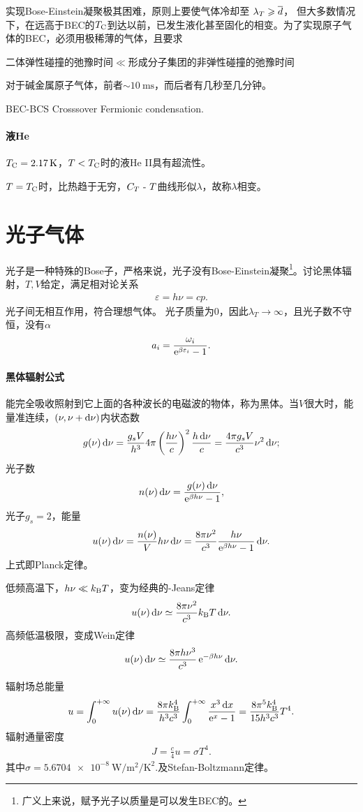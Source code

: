 实现Bose-Einstein凝聚极其困难，原则上要使气体冷却至
$\lambda_T\geqslant\overline{d}$，
但大多数情况下，在远高于BEC的$T_\mathrm C$到达以前，已发生液化甚至固化的相变。为了实现原子气体的BEC，必须用极稀薄的气体，且要求
\begin{center}
	二体弹性碰撞的弛豫时间$\ll$形成分子集团的非弹性碰撞的弛豫时间
\end{center}
对于碱金属原子气体，前者$\sim\SI{10}\ms$，而后者有几秒至几分钟。%

BEC-BCS Crosssover Fermionic condensation.
\paragraph{液He}$T_\crt=\SI{2.17}\K$，$T<T_\mathrm C$时的液He II具有超流性。

$T=T_\mathrm C$时，比热趋于无穷，$C_T~\text{-}~ T$曲线形似$\lambda$，故称$\lambda$相变。
\section{光子气体}
光子是一种特殊的Bose子，严格来说，光子没有Bose-Einstein凝聚\footnote{广义上来说，赋予光子以质量是可以发生BEC的。}。讨论黑体辐射，$T,V$给定，满足相对论关系
\begin{align}
	\varepsilon=h\nu=cp.
\end{align}
光子间无相互作用，符合理想气体。%
光子质量为0，因此$\lambda_T\to\infty$，且光子数不守恒，没有$\alpha$
\[
	a_i=\frac{\omega_i}{\mathop{}\!\mathrm{e}^{\beta\varepsilon_i}-1}.
\]
\paragraph{黑体辐射公式}能完全吸收照射到它上面的各种波长的电磁波的物体，称为黑体。当$V$很大时，能量准连续，$(\nu,\nu+\mathop{}\!\mathrm{d}\nu)$内状态数
\[
	g(\nu)\mathop{}\!\mathrm{d}\nu=\frac{g_sV}{h^3}4\pi\left(\frac{h\nu}c\right)^2\frac{h\mathop{}\!\mathrm{d}\nu}{c}=\frac{4\pi g_sV}{c^3}\nu^2\mathop{}\!\mathrm{d}\nu;
\]
光子数 
\[
	n(\nu)\mathop{}\!\mathrm{d}\nu=\frac{g(\nu)\mathop{}\!\mathrm{d}\nu}{\mathop{}\!\mathrm{e}^{\beta h\nu}-1},
\]
光子$g_s=2$，能量 
\begin{align}
	u(\nu)\mathop{}\!\mathrm{d}\nu=\frac{n(\nu)}Vh\nu\mathop{}\!\mathrm{d}\nu=\frac{8\pi\nu^2}{c^3}\frac{h\nu}{\mathop{}\!\mathrm{e}^{\beta h\nu}-1}\mathop{}\!\mathrm{d}\nu.
\end{align}
上式即Planck定律。

低频高温下，$h\nu\ll k_{\mathrm B} T$，变为经典的\Rayl-Jeans定律
\[
	u(\nu)\mathop{}\!\mathrm{d}\nu\simeq\frac{8\pi\nu^2}{c^3}k_{\mathrm B} T\mathop{}\!\mathrm{d}\nu.
\]
高频低温极限，变成Wein定律
\[
	u(\nu)\mathop{}\!\mathrm{d}\nu\simeq\frac{8\pi h\nu^3}{c^3}\mathop{}\!\mathrm{e}^{-\beta h\nu}\mathop{}\!\mathrm{d}\nu.
\]

辐射场总能量
\[
	u=\int_0^{+\infty} u(\nu)\mathop{}\!\mathrm{d}\nu=\frac{8\pi k_{\mathrm B}^4}{h^3c^3}\int_0^{+\infty}\frac{x^3\mathop{}\!\mathrm{d} x}{\mathop{}\!\mathrm{e}^ x-1}=\frac{8\pi^5k_{\mathrm B}^4}{15h^3c^3}T^4.
\]
辐射通量密度
\begin{align}
	J=\frac c4u=\sigma T^4.
\end{align}
其中$\sigma=\SI{5.6704e-8}{\W\per\m\squared\per\K\squared}.$及Stefan-Boltzmann定律。

